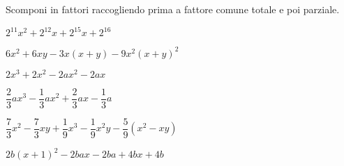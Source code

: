 % 

\begin{esercizio}[*]
\label{ese:div.016}
Scomponi in fattori raccogliendo prima a fattore comune totale e poi 
parziale.
\begin{enumeratea}
\item \(2^{11}x^{2}+2^{12}x+2^{15}x+2^{16}\)
\item \(6x^{2}+6xy-3x(x+y)-9x^{2}(x+y)^{2}\)
\item \(2x^{3}+2x^{2}-2ax^{2}-2ax\)
\item \(\dfrac{2}{3}ax^{3}-\dfrac{1}{3}ax^{2}+\dfrac{2}{3}ax-\dfrac{1}{3}a\)
\item \(\dfrac{7}{3}x^{2}-\dfrac{7}{3}xy+\dfrac{1}{9}x^{3}-
\dfrac{1}{9}x^{2}y-\dfrac{5}{9}(x^{2}-xy)\)
\item \(2b(x+1)^{2}-2bax-2ba+4bx+4b\)
\end{enumeratea}
\end{esercizio}


